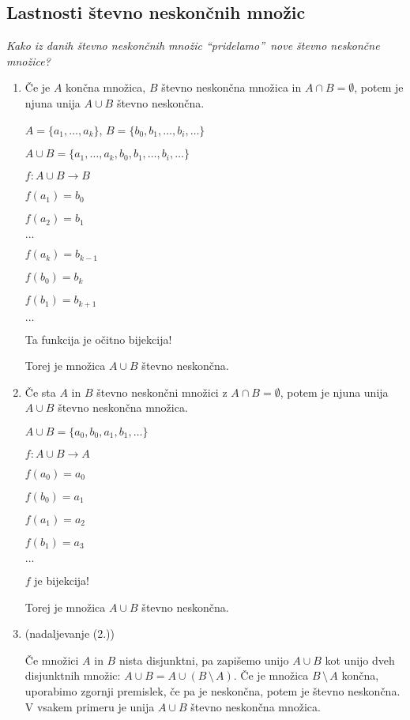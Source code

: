\documentclass[11pt,paper=b5,footinclude,headinclude]{scrbook} %
\def\brez {{\,\setminus\,}}
\begin{document}
\subsection{Lastnosti števno neskončnih množic}

{\em Kako iz danih števno neskončnih množic ``pridelamo''~nove števno neskončne množice?}

\begin{enumerate}[(1.)]
\item Če je $A$ končna množica, $B$ števno neskončna množica in $A\cap B = \emptyset$, potem je njuna unija $A\cup B$ števno neskončna.

$A = \{a_1,\ldots, a_k\}$, $B = \{b_0,b_1,\ldots, b_i, \ldots\}$

$A\cup B = \{a_1,\ldots, a_k, b_0,b_1,\ldots, b_i, \ldots\}$

$f:A\cup B \to B$

$f(a_1) = b_0$

$f(a_2) = b_1$

$\ldots$

$f(a_k) = b_{k-1}$

$f(b_0) = b_k$

$f(b_1) = b_{k+1}$

$\ldots$

Ta funkcija je očitno bijekcija!

Torej je množica $A\cup B$ števno neskončna.

\item Če sta $A$ in $B$ števno neskončni množici z $A\cap B = \emptyset$, potem je njuna unija $A\cup B$ števno neskončna množica.

$A\cup B = \{a_0,b_0,a_1,b_1,\ldots\}$

$f:A\cup B\to A$

$f(a_0) = a_0$

$f(b_0) = a_1$

$f(a_1) = a_2$

$f(b_1) = a_3$

$\ldots$

$f$ je bijekcija!

Torej je množica $A\cup B$ števno neskončna.

\item (nadaljevanje (2.))

Če množici $A$ in $B$ nista disjunktni, pa zapišemo unijo $A\cup B$ kot unijo dveh
disjunktnih množic: $A\cup B=A\cup (B\brez A)$. Če je množica $B\brez A$ končna, uporabimo zgornji
premislek, če pa je neskončna, potem je števno neskončna.
V vsakem primeru je unija $A\cup B$ števno neskončna množica.


\end{enumerate}
\end{document}

